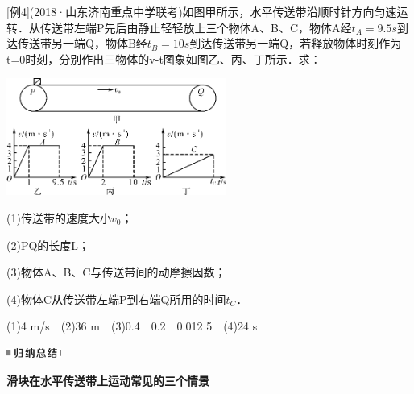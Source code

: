 \documentclass[cn,10.5pt,chinese,mac,chinesefont=founder]{elegantbook}
\begin{document}
{[}例4{]}(2018·山东济南重点中学联考)如图甲所示，水平传送带沿顺时针方向匀速运转．从传送带左端P先后由静止轻轻放上三个物体A、B、C，物体A经$t_A=9.5s$到达传送带另一端Q，物体B经$t_B=10s$到达传送带另一端Q，若释放物体时刻作为t=0时刻，分别作出三物体的v-t图象如图乙、丙、丁所示．求：

\begin{center}\includegraphics[width=2.84375in,height=1.51042in]{media/image122.png}\end{center}

(1)传送带的速度大小$v_0$；

(2)PQ的长度L；

(3)物体A、B、C与传送带间的动摩擦因数；

(4)物体C从传送带左端P到右端Q所用的时间$t_C$．
\begin{solution}
	(1)4 m/s　(2)36 m　(3)0.4　0.2　0.012 5　(4)24 s
\end{solution}

\begin{center}\includegraphics[width=0.70833in,height=0.125in]{media/image13.png}

\textbf{滑块在水平传送带上运动常见的三个情景}
\end{center}
\end{document}

